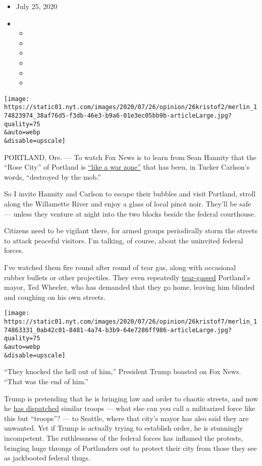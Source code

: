 \begin{itemize}
\item
  July 25, 2020
\item
  \begin{itemize}
  \item
  \item
  \item
  \item
  \item
  \item
  \end{itemize}
\end{itemize}

\texttt{[image: https://static01.nyt.com/images/2020/07/26/opinion/26kristof2/merlin\_174823974\_38af76d5-f3db-46e3-b9a6-01e3ec05bb9b-articleLarge.jpg?quality=75\\\&auto=webp\\\&disable=upscale]}

PORTLAND, Ore. --- To watch Fox News is to learn from Sean Hannity that
the ``Rose City'' of Portland is
\href{https://www.nytimes.com/2020/07/22/business/media/trump-limbaugh-hannity.html}{``like
a war zone''} that has been, in Tucker Carlson's words, ``destroyed by
the mob.''

So I invite Hannity and Carlson to escape their bubbles and visit
Portland, stroll along the Willamette River and enjoy a glass of local
pinot noir. They'll be safe --- unless they venture at night into the
two blocks beside the federal courthouse.

Citizens need to be vigilant there, for armed groups periodically storm
the streets to attack peaceful visitors. I'm talking, of course, about
the uninvited federal forces.

I've watched them fire round after round of tear gas, along with
occasional rubber bullets or other projectiles. They even repeatedly
\href{https://www.nytimes.com/2020/07/23/us/portland-protest-tear-gas-mayor.html}{tear-gassed}
Portland's mayor, Ted Wheeler, who has demanded that they go home,
leaving him blinded and coughing on his own streets.

\texttt{[image: https://static01.nyt.com/images/2020/07/26/opinion/26kristof7/merlin\_174863331\_0ab42c01-8481-4a74-b3b9-64e7286ff986-articleLarge.jpg?quality=75\\\&auto=webp\\\&disable=upscale]}

``They knocked the hell out of him,'' President Trump boasted on Fox
News. ``That was the end of him.''

Trump is pretending that he is bringing law and order to chaotic
streets, and now he
\href{https://www.nytimes.com/2020/07/23/us/seattle-protests-feds.html}{has
dispatched} similar troops --- what else can you call a militarized
force like this but ``troops''? --- to Seattle, where that city's mayor
has also said they are unwanted. Yet if Trump is actually trying to
establish order, he is stunningly incompetent. The ruthlessness of the
federal forces has inflamed the protests, bringing huge throngs of
Portlanders out to protect their city from those they see as jackbooted
federal thugs.

